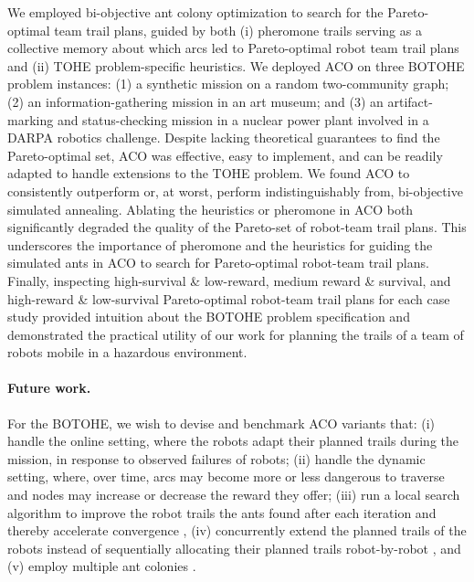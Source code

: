 \documentclass[fleqn,10pt,lineno]{wlpeerj}
\begin{document}
We employed bi-objective ant colony optimization to search for the Pareto-optimal team trail plans, guided by both (i) pheromone trails serving as a collective memory about which arcs led to Pareto-optimal robot team trail plans and (ii) TOHE problem-specific heuristics. We deployed ACO on three BOTOHE problem instances: (1) a synthetic mission on a random two-community graph; (2) an information-gathering mission in an art museum; and (3) an artifact-marking and status-checking mission in a nuclear power plant involved in a DARPA robotics challenge.
Despite lacking theoretical guarantees to find the Pareto-optimal set, ACO was effective, easy to implement, and can be readily adapted to handle extensions to the TOHE problem. 
We found ACO to consistently outperform or, at worst, perform indistinguishably from, bi-objective simulated annealing.
Ablating the heuristics or pheromone in ACO both significantly degraded the quality of the Pareto-set of robot-team trail plans. 
This underscores the importance of pheromone and the heuristics for guiding the simulated ants in ACO to search for Pareto-optimal robot-team trail plans. 
Finally, inspecting high-survival \& low-reward, medium reward \& survival, and high-reward \& low-survival Pareto-optimal robot-team trail plans for each case study provided intuition about the BOTOHE problem specification and demonstrated the practical utility of our work for planning the trails of a team of robots mobile in a hazardous environment.

\paragraph{Future work.}
For the BOTOHE, we wish to devise and benchmark ACO variants that:
(i) handle the online setting, where the robots adapt their planned trails during the mission, in response to observed failures of robots; 
(ii) handle the dynamic setting, where, over time, arcs may become more or less dangerous to traverse and nodes may increase or decrease the reward they offer;
(iii) run a local search algorithm to improve the robot trails the ants found after each iteration and thereby accelerate convergence \cite{dorigo2006ant}, 
(iv) concurrently extend the planned trails of the robots instead of sequentially allocating their planned trails robot-by-robot \cite{ke2008ants}, and 
(v) employ multiple ant colonies \cite{iredi2001bi}.
\end{document}
